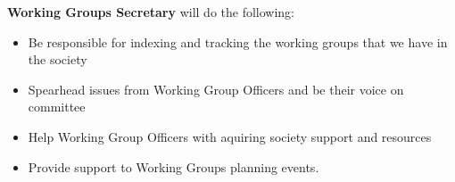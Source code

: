 \begin{subclause}
	\textbf{Working Groups Secretary} will do the following:
	\begin{itemize}[label=--,topsep=0em,itemsep=0em]
		\item Be responsible for indexing and tracking the working groups that we have in the society
		\item Spearhead issues from Working Group Officers and be their voice on committee
        \item Help Working Group Officers with aquiring society support and resources
        \item Provide support to Working Groups planning events.
	\end{itemize}
\end{subclause}
